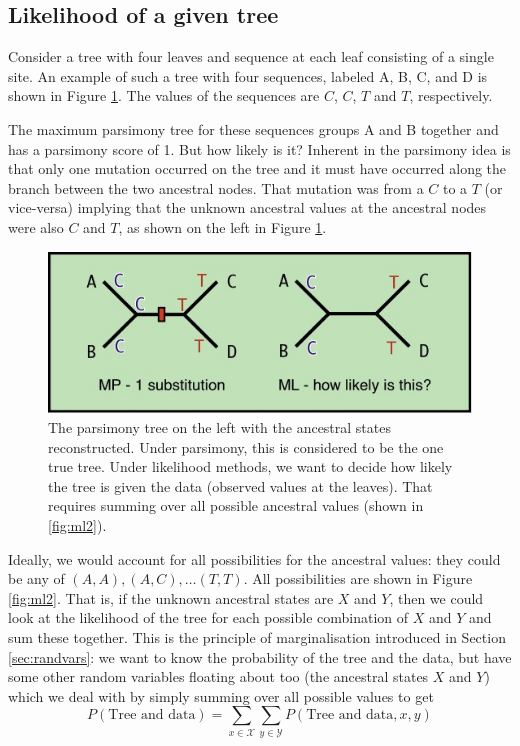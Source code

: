 \documentclass[11pt]{article}
\begin{document}
\subsection{Likelihood of a given tree}

Consider a tree with four leaves and sequence at each leaf consisting of a single site.  An example of such a tree with four sequences, labeled A, B, C, and D is shown in Figure \ref{fig:ml1}.  The values of the sequences are $C$, $C$, $T$ and $T$, respectively.  

The maximum parsimony tree for these sequences groups A and B together and has a parsimony score of 1.  But how likely is it?  Inherent in the parsimony idea is that only one mutation occurred on the tree and it must have occurred along the branch between the two ancestral nodes.  That mutation was from a $C$ to a $T$ (or vice-versa) implying that the unknown ancestral values at the ancestral nodes were also $C$ and $T$, as shown on the left in Figure \ref{fig:ml1}.



\begin{figure}[hbtp]
\includegraphics[width=12cm]{figures/ml1}
\caption{The parsimony tree on the left with the ancestral states reconstructed.  Under parsimony, this is considered to be the one true tree.  Under likelihood methods, we want to decide how likely the tree is given the data (observed values at the leaves).  That requires summing over all possible ancestral values  (shown in \ref{fig:ml2}).}
\label{fig:ml1}
\end{figure}

Ideally, we would account for all possibilities for the ancestral values: they could be any of $(A,A), (A,C), \ldots (T,T)$. All possibilities are shown in Figure \ref{fig:ml2}.  That is, if the unknown ancestral states are $X$ and $Y$, then we could look at the likelihood of the tree for each possible combination of $X$ and $Y$ and sum these together.  This is the principle of marginalisation introduced in Section \ref{sec:randvars}: we want to know the probability of the tree and the data, but have some other random variables floating about too (the ancestral states $X$ and $Y$) which we deal with by simply summing over all possible values to get  \[ P(\mbox{Tree and data}) = \sum_{x \in \mathcal X}  \sum_{y \in \mathcal Y} P( \mbox{Tree and data},x,y) \]
\end{document}
